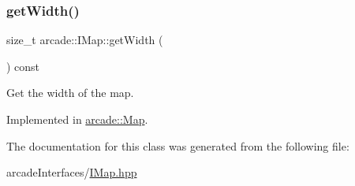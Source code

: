 \subsubsection{\texorpdfstring{get\+Width()}{getWidth()}}
{\footnotesize\ttfamily size\+\_\+t arcade\+::\+I\+Map\+::get\+Width (\begin{DoxyParamCaption}{ }\end{DoxyParamCaption}) const\hspace{0.3cm}{\ttfamily [pure virtual]}}



Get the width of the map. 



Implemented in \hyperlink{classarcade_1_1_map_af48996ef9fc333a7c9ab6a9f2ddb7b56}{arcade\+::\+Map}.



The documentation for this class was generated from the following file\+:\begin{DoxyCompactItemize}
\item 
arcade\+Interfaces/\hyperlink{_i_map_8hpp}{I\+Map.\+hpp}\end{DoxyCompactItemize}
